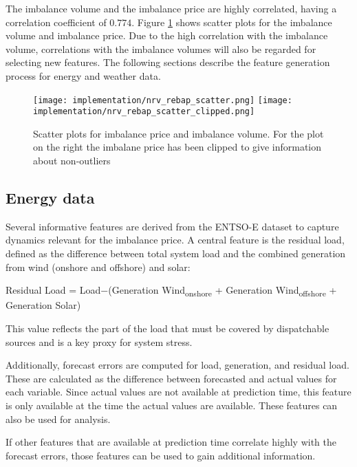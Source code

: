 \documentclass[class=scrbook, crop=false]{standalone}
\begin{document}
The imbalance volume and the imbalance price are highly correlated, having a correlation coefficient of $0.774$. 
Figure \ref{Figure::volume_price_scatter} shows scatter plots for the imbalance volume and imbalance price.
Due to the high correlation with the imbalance volume, correlations with the imbalance volumes will also be regarded for selecting new features.
The following sections describe the feature generation process for energy and weather data.

\begin{figure}[ht]
            \centering
            \texttt{[image: implementation/nrv\_rebap\_scatter.png]}
            \texttt{[image: implementation/nrv\_rebap\_scatter\_clipped.png]}
            \caption[Scatter plots for imbalance price and imbalance volume. For the plot on the right the imbalane price has been clipped to give information about non-outliers]{Scatter plots for imbalance price and imbalance volume. For the plot on the right the imbalane price has been clipped to give information about non-outliers}
            \label{Figure::volume_price_scatter}
\end{figure}

    \subsection{Energy data}
    \label{Section::FE_Energy_Data}

Several informative features are derived from the ENTSO-E dataset to capture dynamics relevant for the imbalance price. A central feature is the residual load, defined as the difference between total system load and the combined generation from wind (onshore and offshore) and solar:

Residual Load = Load−(Generation Wind\textsubscript{onshore} + Generation Wind\textsubscript{offshore} + Generation Solar)

This value reflects the part of the load that must be covered by dispatchable sources and is a key proxy for system stress.

Additionally, forecast errors are computed for load, generation, and residual load. These are calculated as the difference between forecasted and actual values for each variable. Since actual values are not available at prediction time, this feature is only available at the time the actual values are available. These features can also be used for analysis. 

If other features that are available at prediction time correlate highly with the forecast errors, those features can be used to gain additional information.
\end{document}

